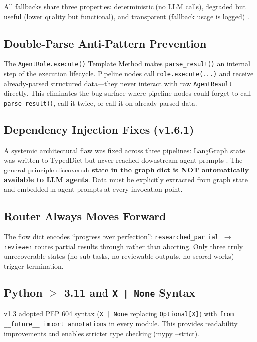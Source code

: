 All fallbacks share three properties: deterministic (no LLM calls), degraded but useful (lower quality but functional), and transparent (fallback usage is logged) \cite{agenticpatterns}.

\subsection{Double-Parse Anti-Pattern Prevention}

The \texttt{AgentRole.execute()} Template Method makes \texttt{parse\_result()} an internal step of the execution lifecycle. Pipeline nodes call \texttt{role.execute(...)} and receive already-parsed structured data---they never interact with raw \texttt{AgentResult} directly. This eliminates the bug surface where pipeline nodes could forget to call \texttt{parse\_result()}, call it twice, or call it on already-parsed data.

\subsection{Dependency Injection Fixes (v1.6.1)}

A systemic architectural flaw was fixed across three pipelines: LangGraph state was written to TypedDict but never reached downstream agent prompts \cite{sagallm}. The general principle discovered: \textbf{state in the graph dict is NOT automatically available to LLM agents}. Data must be explicitly extracted from graph state and embedded in agent prompts at every invocation point.

\subsection{Router Always Moves Forward}

The flow dict encodes ``progress over perfection'': \texttt{researched\_partial $\rightarrow$ reviewer} routes partial results through rather than aborting. Only three truly unrecoverable states (no sub-tasks, no reviewable outputs, no scored works) trigger termination.

\subsection{Python $\ge$ 3.11 and \texttt{X | None} Syntax}

v1.3 adopted PEP 604 syntax \cite{pep604} (\texttt{X | None} replacing \texttt{Optional[X]}) with \texttt{from \_\_future\_\_ import annotations} in every module. This provides readability improvements and enables stricter type checking (mypy --strict).

